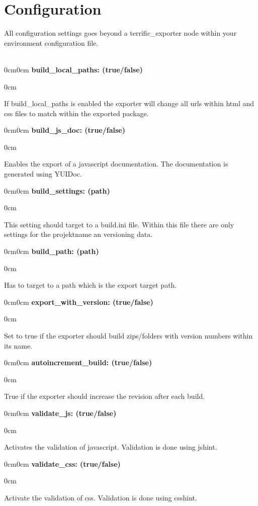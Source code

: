 \section{Configuration}

\newcommand{\optiondesc}[2]{
	\begin{adjustwidth}{0cm}{0cm}
		\noindent \textbf{#1}\\
		\vspace{-1em}
		\begin{adjustwidth}{\parindent}{0cm}
			#2
		\end{adjustwidth}
	\end{adjustwidth}
}

All configuration settings goes beyond a terrific\_exporter node within your environment configuration file.\\
\\
\optiondesc{build\_local\_paths: (true/false)}{
	If build\_local\_paths is enabled the exporter will change all urls within html and css files to match within the exported package.\\
}

\optiondesc{build\_js\_doc: (true/false)}{
	Enables the export of a javascript documentation. The documentation is generated using YUIDoc.\\
}

\optiondesc{build\_settings: (path)}{
	This setting should target to a build.ini file. Within this file there are only settings for the projektname an versioning data.\\
}

\optiondesc{build\_path: (path)}{
	Has to target to a path which is the export target path.\\
}

\optiondesc{export\_with\_version: (true/false)}{
	Set to true if the exporter should build zips/folders with version numbers within its name.\\
}

\optiondesc{autoincrement\_build: (true/false)}{
	True if the exporter should increase the revision after each build.\\
}

\optiondesc{validate\_js: (true/false)}{
	Activates the validation of javascript. Validation is done using jshint.\\
}

\optiondesc{validate\_css: (true/false)}{
	Activate the validation of css. Validation is done using csshint.\\
}

